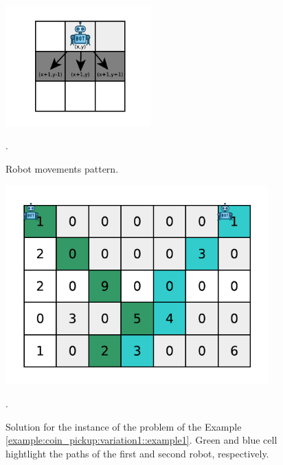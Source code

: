 \begin{figure}
	\centering
	\includegraphics[width=0.5\textwidth]{sources/coin_pickup/images/robot_movement_variation}
	\caption[Robot possible movements]{Robot movements pattern.}.
	\label{fig:coin_pickup:variation1:robot_movements}
\end{figure}



\begin{figure}
	\centering
	\includegraphics[width=0.9\textwidth]{sources/coin_pickup/images/variation1_example1}
	\caption[Robot possible movements]{Solution for the instance of the problem of the Example \ref{example:coin_pickup:variation1::example1}. Green and blue cell hightlight the paths of the first and second robot, respectively.}.
	\label{fig:coin_pickup:variation1:example1}
\end{figure}
